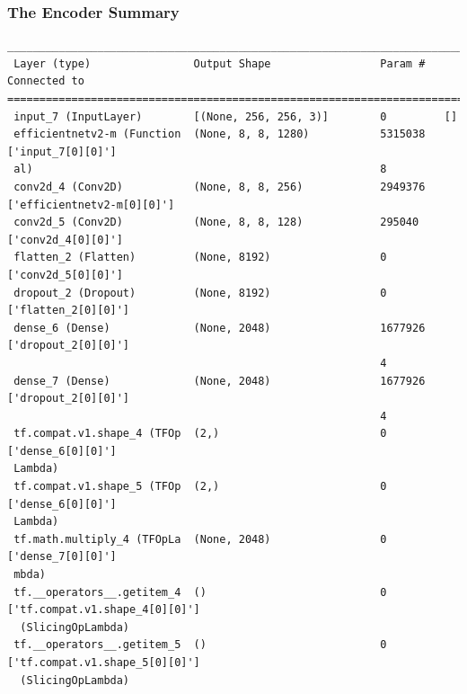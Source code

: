 \documentclass{article}
\begin{document}
\subsubsection{The Encoder Summary}
\begin{verbatim}
__________________________________________________________________________________________________
 Layer (type)                Output Shape                 Param #   Connected to                  
==================================================================================================
 input_7 (InputLayer)        [(None, 256, 256, 3)]        0         []                            
 efficientnetv2-m (Function  (None, 8, 8, 1280)           5315038   ['input_7[0][0]']             
 al)                                                      8                                       
 conv2d_4 (Conv2D)           (None, 8, 8, 256)            2949376   ['efficientnetv2-m[0][0]']    
 conv2d_5 (Conv2D)           (None, 8, 8, 128)            295040    ['conv2d_4[0][0]']            
 flatten_2 (Flatten)         (None, 8192)                 0         ['conv2d_5[0][0]']            
 dropout_2 (Dropout)         (None, 8192)                 0         ['flatten_2[0][0]']           
 dense_6 (Dense)             (None, 2048)                 1677926   ['dropout_2[0][0]']           
                                                          4                                       
 dense_7 (Dense)             (None, 2048)                 1677926   ['dropout_2[0][0]']           
                                                          4                                       
 tf.compat.v1.shape_4 (TFOp  (2,)                         0         ['dense_6[0][0]']             
 Lambda)                                                                                          
 tf.compat.v1.shape_5 (TFOp  (2,)                         0         ['dense_6[0][0]']             
 Lambda)                                                                                          
 tf.math.multiply_4 (TFOpLa  (None, 2048)                 0         ['dense_7[0][0]']             
 mbda)                                                                                            
 tf.__operators__.getitem_4  ()                           0         ['tf.compat.v1.shape_4[0][0]']
  (SlicingOpLambda)                                                                               
 tf.__operators__.getitem_5  ()                           0         ['tf.compat.v1.shape_5[0][0]']
  (SlicingOpLambda)                                                                               

\end{verbatim}
\end{document}
